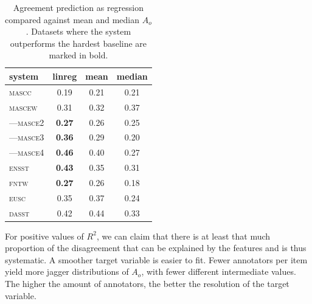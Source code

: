 \documentclass[11pt,a4paper]{article}
\begin{document}
\begin{table}[Ht!]

\begin{center}
  \begin{tabular}{lc|cc}
 \toprule
system & linreg & mean & median \\
 \midrule
 \textsc{mascc} & 0.19 & 0.21 & 0.21 \\
 \textsc{mascew} & 0.31 & 0.32 & 0.37 \\
---\textsc{masce2} & \textbf{0.27} & 0.26 & 0.25 \\
---\textsc{masce3} &\textbf{ 0.36} & 0.29 & 0.20 \\
---\textsc{masce4} & \textbf{0.46} & 0.40 & 0.27 \\
\textsc{ensst} & \textbf{0.43} & 0.35 & 0.31 \\
\textsc{fntw} & \textbf{0.27} & 0.26 & 0.18 \\

\textsc{eusc} & 0.35 & 0.37 & 0.24 \\
\textsc{dasst} & 0.42 & 0.44 & 0.33 \\

\bottomrule

  \end{tabular}  
\end{center}
\caption{Agreement prediction as regression compared against mean and median $A_o$. Datasets where the system outperforms the hardest baseline are marked in bold. \label{tab:regagr_results}}
\end{table} 

For positive values of $R^2$, we can claim that there is at least that much proportion of the disagreement that can be explained by the features and is thus systematic. A smoother target variable is easier to fit. Fewer annotators per item yield more jagger distributions of $A_o$, with fewer different intermediate values. The higher the amount of annotators, the better the resolution of the target variable. 
\end{document}
